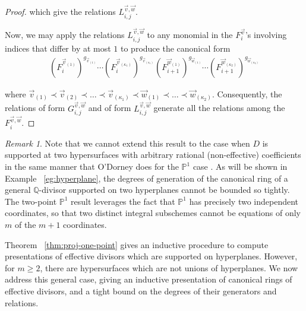\documentclass{amsart}
\theoremstyle{plain}
\theoremstyle{definition}
\theoremstyle{remark}
\newtheorem{rem}[thm]{Remark}
\numberwithin{equation}{section}
\newcommand\bq{{\mathbb Q}}
\newcommand\bp{{\mathbb P}}
\begin{document}
\begin{proof}
\noindent 
which give the relations $L_{i, j}^{\vec{v}, \vec{w}}$.

Now, we may apply the relations $L_{i, j}^{\vec{v}, \vec{w}}$
to any monomial in the $F_i^{\vec{v}}$'s involving
indices that differ by at most $1$ to produce the canonical form
\begin{align*}
	(F_i^{\vec{v}_{(1)}})^{g_{\vec{v}_{(1)}}} \cdots
	(F_i^{\vec{v}_{(\kappa_1)}})^{g_{\vec{v}_{(\kappa_1)}}}
	(F_{i + 1}^{\vec{w}_{(1)}})^{g_{\vec{w}_{(1)}}} \cdots
	(F_{i + 1}^{\vec{w}_{(\kappa_2)}})^{g_{\vec{w}_{(\kappa_2)}}}
\end{align*}

\noindent
where $\vec{v}_{(1)} \prec \vec{v}_{(2)} \prec \ldots \prec
\vec{v}_{(\kappa_1)} \prec \vec{w}_{(1)} \prec \ldots \prec
\vec{w}_{(\kappa_2)}$. Consequently, the relations of form
$G_{i, j}^{\vec{v}, \vec{w}}$ and of form $L_{i, j}^{\vec{v},
\vec{w}}$ generate all the relations among the $F_{i}^{\vec{v},
\vec{w}}$.
\end{proof}

\begin{rem}
\label{rem:proj-two-points}
Note that we cannot extend this result to the case when
$D$ is supported at two hypersurfaces with arbitrary rational (non-effective)
coefficients in the same manner that O'Dorney does for the
$\bp^1$ case \cite[Section 4]{dorney:canonical}. As will be shown
in Example ~\ref{eg:hyperplane}, the degrees of generation of the
canonical ring of a general $\bq$-divisor supported on two
hyperplanes cannot be bounded so tightly. The two-point
$\bp^1$ result leverages the fact that $\bp^1$ has precisely two
independent coordinates, so that two distinct integral subschemes
cannot be equations of only $m$ of the $m+1$ coordinates.
\end{rem}


Theorem ~\ref{thm:proj-one-point} gives an inductive procedure to
compute presentations of effective divisors which are supported on
hyperplanes. However, for $m \geq 2$, there are hypersurfaces which
are not unions of hyperplanes. We now address this general case, giving an inductive presentation of canonical rings of effective divisors, and a tight bound on the degrees of their generators and
relations.
\end{document}
